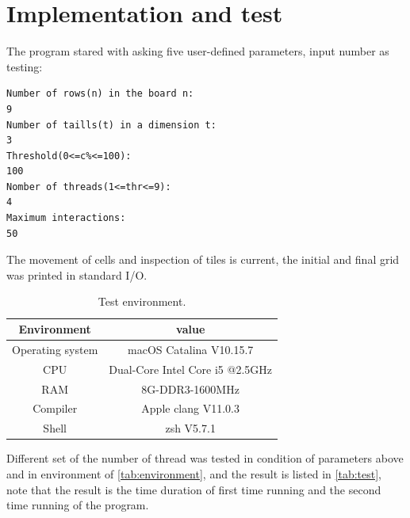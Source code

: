 \documentclass[12pt]{article}
\begin{document}
\section{Implementation and test}
The program stared with asking five user-defined parameters, input number as testing:
\begin{lstlisting}[style = bash]
Number of rows(n) in the board n:
9
Number of taills(t) in a dimension t:
3
Threshold(0<=c%<=100):
100
Nomber of threads(1<=thr<=9):
4
Maximum interactions:
50
\end{lstlisting}
The movement of cells and inspection of tiles is current, the initial and final grid was printed in standard I/O. 
\begin{table}[ht]
    \centering
    \caption{Test environment.}
    \label{tab:environment}
    \begin{tabular}{@{}cc@{}}
    \toprule
    {\color[HTML]{000000} Environment}      & {\color[HTML]{000000} value}                           \\ \midrule
    {\color[HTML]{000000} Operating system} & {\color[HTML]{000000} macOS Catalina V10.15.7}         \\
    {\color[HTML]{000000} CPU}              & {\color[HTML]{000000} Dual-Core Intel Core i5 @2.5GHz} \\
    {\color[HTML]{000000} RAM}              & {\color[HTML]{000000} 8G-DDR3-1600MHz}                 \\
    {\color[HTML]{000000} Compiler}         & {\color[HTML]{000000} Apple clang V11.0.3}             \\
    Shell                                   & zsh V5.7.1                                             \\ \bottomrule
    \end{tabular}
    \end{table}
Different set of the number of thread was tested in condition of parameters above and in environment of \autoref{tab:environment}, and the result is listed in \autoref{tab:test}, note that the result is the time duration of first time running and the second time running of the program.
\end{document}
